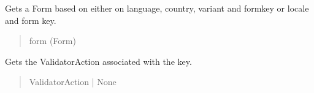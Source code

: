\documentclass[letterpaper,10pt,english]{sphinxmanual}
\begin{document}
\begin{fulllineitems}

\begin{fulllineitems}
\label{\detokenize{apache_commons_validator_python:apache_commons_validator_python.validator_resources_new.ValidatorResources.get_form}}
\pysigstartsignatures
{}
\pysigstopsignatures
\sphinxAtStartPar
Gets a Form based on either on language, country, variant and formkey or
locale and form key.
\begin{quote}\begin{description}
\sphinxAtStartPar
{} \textendash{} 

\sphinxAtStartPar
form (Form)

\end{description}\end{quote}

\end{fulllineitems}


\begin{fulllineitems}
\label{\detokenize{apache_commons_validator_python:apache_commons_validator_python.validator_resources_new.ValidatorResources.get_validator_action}}
\pysigstartsignatures
{}
\pysigstopsignatures
\sphinxAtStartPar
Gets the ValidatorAction associated with the key.
\begin{quote}\begin{description}
\sphinxAtStartPar
ValidatorAction | None


\end{description}
\end{quote}
\end{fulllineitems}
\end{fulllineitems}
\end{document}
